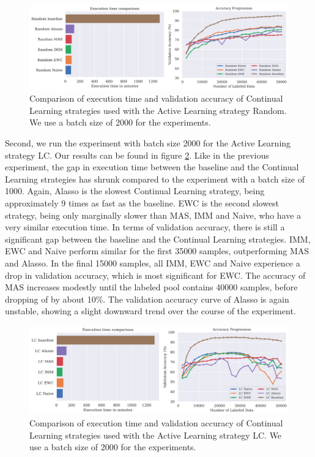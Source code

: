 \begin{figure}[h]
    \centering
    \includegraphics[width=\linewidth]{images/results_CAL/Random_CAL_2000b.png}
    \caption[Continual Active Learning Random 2000 batch size]{Comparison of execution time and validation accuracy of Continual Learning strategies used with the Active Learning strategy
    Random. We use a batch size of 2000 for the experiments.}
    \label{fig:Evaluation:Results:CAL:Random2000}
\end{figure}

Second, we run the experiment with batch size 2000 for the Active Learning strategy LC. Our results can be found in figure \ref{fig:Evaluation:Results:CAL:LC2000}. Like in the previous experiment,
the gap in execution time between the baseline and the Continual Learning strategies has shrunk compared to the experiment with a batch size of 1000. Again, Alasso is the slowest Continual Learning
strategy, being approximately 9 times as fast as the baseline. EWC is the second slowest strategy, being only marginally slower than MAS, IMM and Naive, who have a very similar execution time.
In terms of validation accuracy, there is still a significant gap between the baseline and the Continual Learning strategies. IMM, EWC and Naive perform similar for the first 35000 samples, outperforming
MAS and Alasso. In the final 15000 samples, all IMM, EWC and Naive experience a drop in validation accuracy, which is most significant for EWC. The accuracy of MAS increases modestly until the labeled
pool contains 40000 samples, before dropping of by about 10\%. The validation accuracy curve of Alasso is again unstable, showing a slight downward trend over the course of the experiment. \par

\begin{figure}[h]
    \centering
    \includegraphics[width=\linewidth]{images/results_CAL/LC_CAL_2000b.png}
    \caption[Continual Active Learning LC 2000 batch size]{Comparison of execution time and validation accuracy of Continual Learning strategies used with the Active Learning strategy
    LC. We use a batch size of 2000 for the experiments.}
    \label{fig:Evaluation:Results:CAL:LC2000}
\end{figure}

